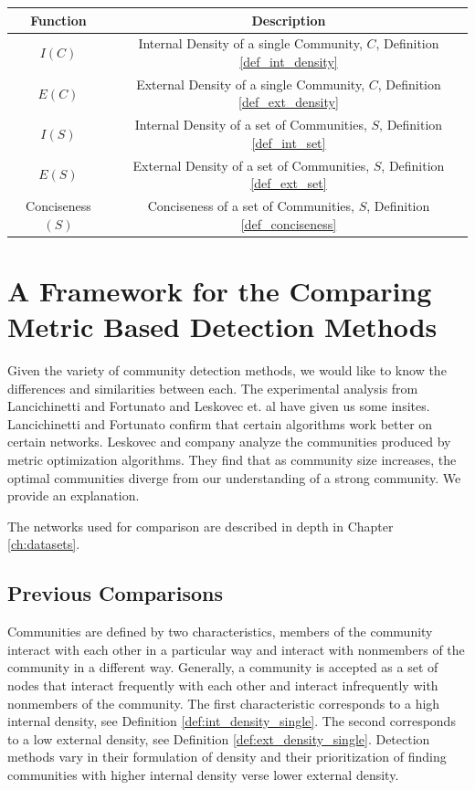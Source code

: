 \documentclass[phd,tocprelim]{cornell}
\renewcommand{\caption}[1]{\singlespacing\hangcaption{#1}\normalspacing}
\begin{document}
\begin{table}
\caption{Introduced Functions}
\begin{center}
\begin{tabular}{|c|c|} \hline
Function & Description \\ \hline
$I(C)$ & Internal Density of a single Community, $C$, Definition \ref{def_int_density} \\ \hline
$E(C)$ & External Density of a single Community, $C$, Definition  \ref{def_ext_density} \\ \hline
$I(S)$ & Internal Density of a set of Communities, $S$, Definition \ref{def_int_set} \\ \hline
$E(S)$ & External Density of a set of Communities, $S$, Definition \ref{def_ext_set} \\ \hline
{\sc Conciseness}$(S)$ & Conciseness of a set of Communities, $S$, Definition \ref{def_conciseness} \\ \hline
\end{tabular}
\end{center}
\label{table_new_functions}
\end{table}

\chapter{A Framework for the Comparing Metric Based Detection Methods}

Given the variety of community detection methods, we would like to know the differences and similarities between each.  The experimental analysis from Lancichinetti and Fortunato \cite{lanc:2009} and Leskovec et. al \cite{leskovec} have given us some insites.  Lancichinetti and Fortunato confirm that certain algorithms work better on certain networks.  Leskovec and company analyze the communities produced by metric optimization algorithms. They find that as community size increases, the optimal communities diverge from our understanding of a strong community.  We provide an explanation.

The networks used for comparison are described in depth in Chapter \ref{ch:datasets}.


\section{Previous Comparisons}

Communities are defined by two characteristics, members of the community interact with each other in a particular way and interact with nonmembers of the community in a different way.  Generally, a community is accepted as a set of nodes that interact frequently with each other and interact infrequently with nonmembers of the community.  The first characteristic corresponds to a high internal density, see Definition \ref{def:int_density_single}.  The second corresponds to a low external density, see Definition \ref{def:ext_density_single}.  Detection methods vary in their formulation of density and their prioritization of finding communities with higher internal density verse lower external density.
\end{document}
